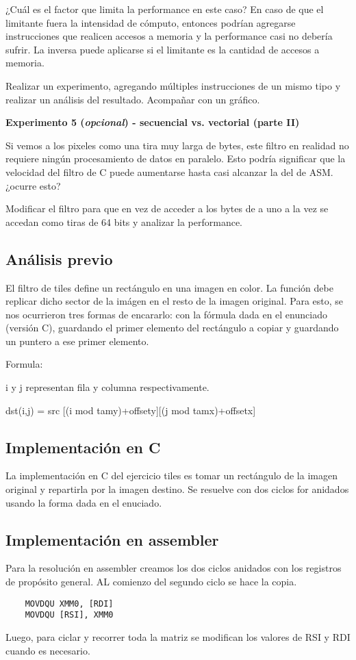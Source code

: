	¿Cuál es el factor que limita la performance en este caso? En caso de que el limitante
	fuera la intensidad de cómputo, entonces podrían agregarse instrucciones que realicen
	accesos a memoria y la performance casi no debería sufrir. La inversa puede aplicarse
	si el limitante es la cantidad de accesos a memoria.
	
	Realizar un experimento, agregando múltiples instrucciones de un mismo tipo y realizar un análisis
	del resultado. Acompañar con un gráfico.

\vspace*{0.3cm} \noindent
\textbf{Experimento 5 (\textit{opcional}) - secuencial vs. vectorial (parte II)}

	Si vemos a los pixeles como una tira muy larga de bytes, este filtro en
	realidad no requiere ningún procesamiento de datos en paralelo. Esto podría
	significar que la velocidad del filtro de C puede aumentarse hasta casi
	alcanzar la del de ASM. ¿ocurre esto?
	
	Modificar el filtro para que en vez de acceder a los bytes de a uno a la vez
	se accedan como tiras de 64 bits y analizar la performance.
	
\newpage

\subsection{An\'alisis previo}
El filtro de tiles define un rect\'angulo en una imagen en color. La funci\'on debe replicar dicho sector de la im\'agen en el resto de la imagen original.
Para esto, se nos ocurrieron tres formas de encararlo: con la f\'ormula dada en el enunciado (versi\'on C), guardando el primer elemento del rect\'angulo a copiar y guardando un puntero a ese primer elemento.

Formula:

i y j representan fila y columna respectivamente.

dst(i,j) = src [(i mod tamy)+offsety][(j mod tamx)+offsetx]

\subsection{Implementaci\'on en C}

La implementaci\'on en C del ejercicio tiles es tomar un rect\'angulo de la imagen original y repartirla por la imagen destino. Se resuelve con dos ciclos for anidados usando la forma dada en el enuciado.

\subsection{Implementaci\'on en assembler}
Para la resoluci\'on en assembler creamos los dos ciclos anidados con los registros de prop\'osito general. AL comienzo del segundo ciclo se hace la copia.
\begin{codesnippet}
\begin{verbatim}
	MOVDQU XMM0, [RDI]
	MOVDQU [RSI], XMM0
\end{verbatim}
\end{codesnippet}
Luego, para ciclar y recorrer toda la matriz se modifican los valores de RSI y RDI cuando es necesario.
